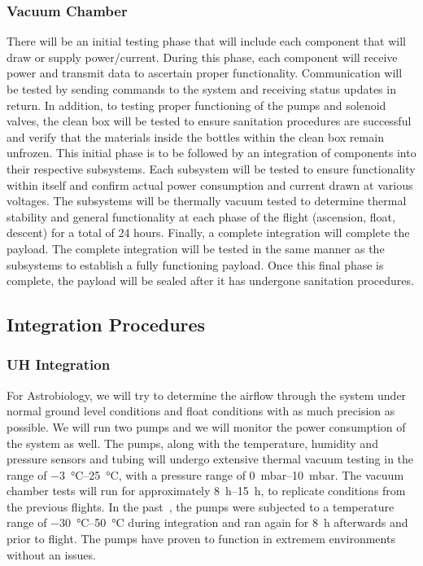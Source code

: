 \subsubsection{Vacuum Chamber}
There will be an initial testing phase that will include each component that will draw or supply power/current. During this phase, each component will receive power and transmit data to ascertain proper functionality. Communication will be tested by sending commands to the system and receiving status updates in return. In addition, to testing proper functioning of the pumps and solenoid valves, the clean box will be tested to ensure sanitation procedures are successful and verify that the materials inside the bottles within the clean box remain unfrozen. This initial phase is to be followed by an integration of components into their respective subsystems. Each subsystem will be tested to ensure functionality within itself and confirm actual power consumption and current drawn at various voltages. The subsystems will be thermally vacuum tested to determine thermal stability and general functionality at each phase of the flight (ascension, float, descent) for a total of 24 hours. Finally, a complete integration will complete the payload. The complete integration will be tested in the same manner as the subsystems to establish a fully functioning payload. Once this final phase is complete, the payload will be sealed after it has undergone sanitation procedures.

\subsection{Integration Procedures}
\subsubsection{UH Integration}
For Astrobiology, we will try to determine the airflow through the system under normal ground level conditions and float conditions with as much precision as possible.  We will run two pumps and we will monitor the power consumption of the system as well. The pumps, along with the temperature, humidity and pressure sensors and tubing will undergo extensive thermal vacuum testing in the range of \SIrange{-3}{25}{\celsius}, with a pressure range of \SIrange{0}{10}{\milli\bar}. The vacuum chamber tests will run for approximately \SIrange{8}{15}{\hour}, to replicate conditions from the previous flights. In the past~\cite{SORA}, the pumps were subjected to a temperature range of \SIrange{-30}{50}{\celsius} during integration and ran again for \SI{8}{\hour} afterwards and prior to flight. The pumps have proven to function in extremem environments without an issues. 

